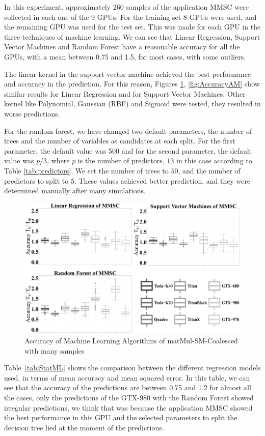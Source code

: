 In this experiment, approximately 260 samples of the application MMSC were collected in each one of the 9 GPUs. For the training set 8 GPUs were used, and the remaining GPU was used for the test set. This was made for each GPU in the three techniques of machine learning. We can see that Linear Regression, Support Vector Machines and Random Forest have a reasonable accuracy for all the GPUs, with a mean between 0.75 and 1.5, for most cases, with some outliers.

The linear kernel in the support vector machine achieved the best performance and accuracy in the prediction. For this reason, Figures \ref{fig:AccMMSC}, \ref{fig:AccuracyAM} show similar results for Linear Regression and for Support Vector Machines. Other kernel like Polynomial, Gaussian (RBF) and Sigmoid were tested, they resulted in worse predictions. 

For the random forest, we have changed two default parameters, the number of trees and the number of variables as candidates at each split. For the first parameter, the default value was 500 and for the second parameter, the default value was $p/3$, where $p$ is the number of predictors, $13$ in this case according to Table \ref{tab:predictors}. We set the number of trees to $50$, and the number of predictors to split to $5$. These values achieved better prediction, and they were determined manually after many simulations.

\begin{figure}[htpb]
\centering
 \includegraphics[scale=.11]{./images/MSCoalesced.eps}
  \caption{Accuracy of Machine Learning Algorithms of matMul-SM-Coalesced with many samples}
 \label{fig:AccMMSC}
\end{figure}

Table~\ref{tab:StatML} shows the comparison between the different regression models used, in terms of mean accuracy and mean squared error. In this table, we can see that the accuracy of the predictions are between 0.75 and 1.2 for almost all the cases, only the predictions of the GTX-980 with the Random Forest showed irregular predictions, we think that was because the application MMSC showed the best performance in this GPU and the selected parameters to split the decision tree lied at the moment of the predictions. 

